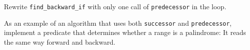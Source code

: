 \begin{exercise}
	Rewrite \verb|find_backward_if| with only one call of \verb|predecessor| in the loop.
\end{exercise}



\begin{exercise}
	As an example of an algorithm that uses both \verb|successor| and \verb|predecessor|,
	implement a predicate that determines whether a range is a palindrome: It reads the
	same way forward and backward.
\end{exercise}
